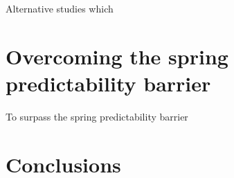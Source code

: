 \documentclass[12pt, onecolumn]{revtex4}    %
\begin{document}
Alternative studies which 


\section{Overcoming the spring predictability barrier}

To surpass the spring predictability barrier 

\section{Conclusions}



\clearpage



\end{document}
